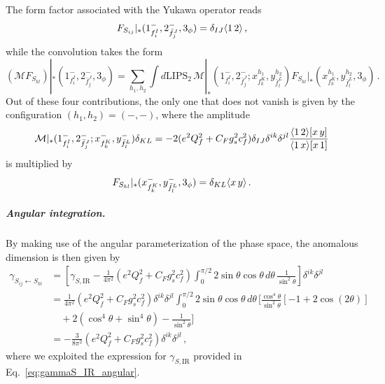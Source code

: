 The form factor associated with the Yukawa operator reads
\begin{equation}
    F_{S_{ij}}|_*(1_{f_i^I}^-,2_{\bar f_j^J}^-,3_\phi) = \delta_{IJ}\langle1\, 2 \rangle\,,
\end{equation}
while the convolution takes the form
\begin{equation}
    (\mathcal M F_{S_{kl}})|_*(1_{f_i^I}^-,2_{\bar f_j^J}^-,3_\phi) = \sum_{h_1,h_2}\int d\text{LIPS}_2\, 
    \mathcal M|_*(1_{f_i^I}^-,2_{\bar f_j^J}^-;x^{h_1}_{f_k^K},y^{h_2}_{\bar f_l^L})
    F_{S_{kl}}|_*(x^{h_1}_{f_k^K},y^{h_2}_{\bar f_l^L},3_\phi)\,.
\end{equation}
Out of these four contributions, the only one that does not vanish is given by the configuration $(h_1,h_2)=(-,-)$, where the amplitude
\begin{equation}
    \mathcal M|_*(1_{f_i^I}^-,2_{\bar f_j^J}^-;x^{-}_{f_k^K},y^{-}_{\bar f_l^L}) \delta_{KL}= -2(e^2Q_f^2+C_Fg_s^2c_f^2)\delta_{IJ}\delta^{ik}\delta^{jl}\frac{\langle1\, 2 \rangle\lbrack x\, y \rbrack}{\langle1\, x \rangle\lbrack x\, 1 \rbrack}
\end{equation}
is multiplied by
\begin{equation}
    F_{S_{kl}}|_*(x^{-}_{f_k^K},y^{-}_{\bar f_l^L},3_\phi) = \delta_{KL}\langle x\, y \rangle\,.
\end{equation}
%

\subparagraph{Angular integration.}
%
By making use of the angular parameterization of the phase space, the anomalous dimension is then given by
\begin{align}
    \gamma_{S_{ij}\leftarrow S_{kl}}&=\left[\gamma_{S,\text{IR}}-\frac{1}{4\pi^2}(e^2Q_f^2+C_Fg_s^2c_f^2)\int_0^{\pi/2}2\sin\theta\cos\theta \,d\theta\,\frac{1}{\sin^2\theta}\right]\delta^{ik}\delta^{jl}\nonumber \\
    &= \frac{1}{4\pi^2}(e^2Q_f^2+C_Fg_s^2c_f^2)\delta^{ik}\delta^{jl} 
    \int_0^{\pi/2}2\sin\theta\cos\theta \,d\theta\,\bigg[\frac{\cos^4\theta}{\sin^2\theta}[-1+2\cos(2\theta)]\nonumber\\&\quad +2(\cos^4\theta + \sin^4\theta)-\frac{1}{\sin^2\theta}\bigg]\nonumber \\
    &= -\frac{3}{8\pi^2}(e^2Q_f^2+C_Fg_s^2c_f^2)\delta^{ik}\delta^{jl} \,,
\end{align}
where we exploited the expression for $\gamma_{S,\text{IR}}$ provided in Eq.~\eqref{eq:gammaS_IR_angular}.

